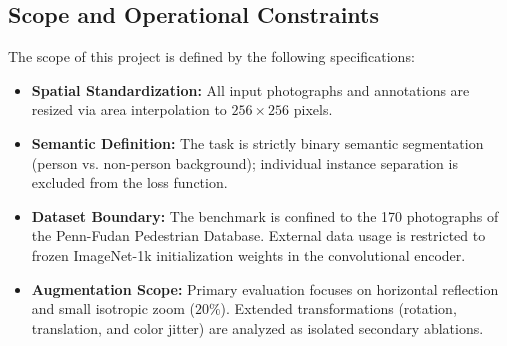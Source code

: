 \documentclass[10pt,a4paper]{article}
\begin{document}
\subsection{Scope and Operational Constraints}
The scope of this project is defined by the following specifications:
\begin{itemize}
    \item \textbf{Spatial Standardization:} All input photographs and annotations are resized via area interpolation to $256 \times 256$ pixels.
    \item \textbf{Semantic Definition:} The task is strictly binary semantic segmentation (person vs. non-person background); individual instance separation is excluded from the loss function.
    \item \textbf{Dataset Boundary:} The benchmark is confined to the 170 photographs of the Penn-Fudan Pedestrian Database. External data usage is restricted to frozen ImageNet-1k initialization weights in the convolutional encoder.
    \item \textbf{Augmentation Scope:} Primary evaluation focuses on horizontal reflection and small isotropic zoom ($20\%$). Extended transformations (rotation, translation, and color jitter) are analyzed as isolated secondary ablations.
\end{itemize}
\end{document}
